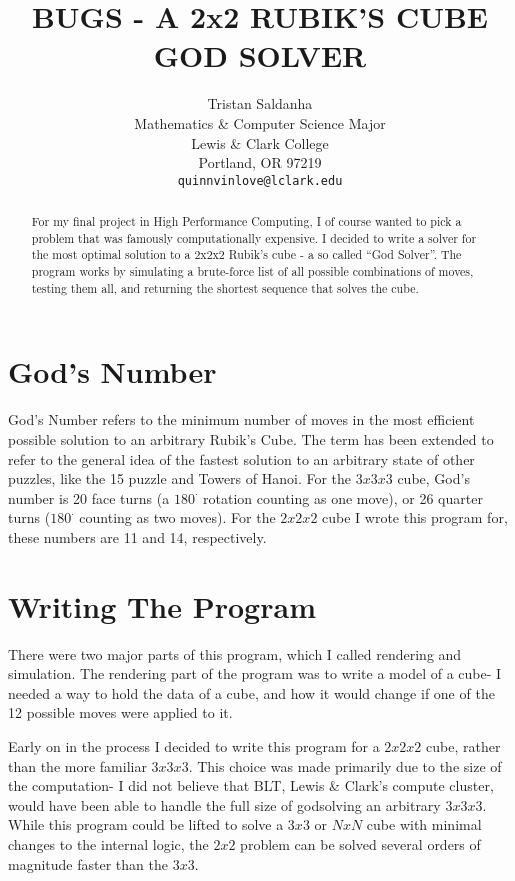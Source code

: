 \documentclass{article}
\title{BUGS - A 2x2 RUBIK’S CUBE GOD SOLVER}
\author{
  Tristan Saldanha\\%
  Mathematics \& Computer Science Major\\
  Lewis \& Clark College\\
  Portland, OR 97219 \\
  \texttt{quinnvinlove@lclark.edu} \\
}
\begin{document}
\maketitle

\begin{abstract}
For my final project in High Performance Computing, I of course wanted to pick a problem that was famously computationally expensive. I decided to write a solver for the most optimal solution to a 2x2x2 Rubik’s cube - a so called “God Solver”. The program works by simulating a brute-force list of all possible combinations of moves, testing them all, and returning the shortest sequence that solves the cube. 

\end{abstract}




\section{God's Number}
God’s Number refers to the minimum number of moves in the most efficient possible solution to an arbitrary Rubik’s Cube. The term has been extended to refer to the general idea of the fastest solution to an arbitrary state of other puzzles, like the 15 puzzle and Towers of Hanoi. For the $3x3x3$ cube, God’s number is 20 face turns (a $180^{\cdot}$ rotation counting as one move), or 26 quarter turns ($180^{\cdot}$ counting as two moves). For the $2x2x2$ cube I wrote this program for, these numbers are 11 and 14, respectively.

\section{Writing The Program}
There were two major parts of this program, which I called rendering and simulation. The rendering part of the program was to write a model of a cube- I needed a way to hold the data of a cube, and how it would change if one of the 12 possible moves were applied to it. 

Early on in the process I decided to write this program for a $2x2x2$ cube, rather than the more familiar $3x3x3$. This choice was made primarily due to the size of the computation- I did not believe that BLT, Lewis \& Clark’s compute cluster, would have been able to handle the full size of godsolving an arbitrary $3x3x3$. While this program could be lifted to solve a $3x3$ or $NxN$ cube with minimal changes to the internal logic, the $2x2$ problem can be solved several orders of magnitude faster than the $3x3$. 
\end{document}
